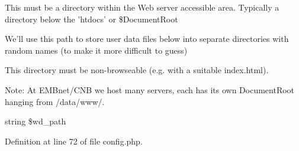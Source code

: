 This must be a directory within the Web server accessible area. Typically a directory below the 'htdocs' or \$Document\-Root

We'll use this path to store user data files below into separate directories with random names (to make it more difficult to guess)

This directory must be non-browseable (e.g. with a suitable index.html).

\begin{Desc}
\item[Note:]At EMBnet/CNB we host many servers, each has its own Document\-Root hanging from /data/www/.\end{Desc}
string \$wd\_\-path 

Definition at line 72 of file config.php.